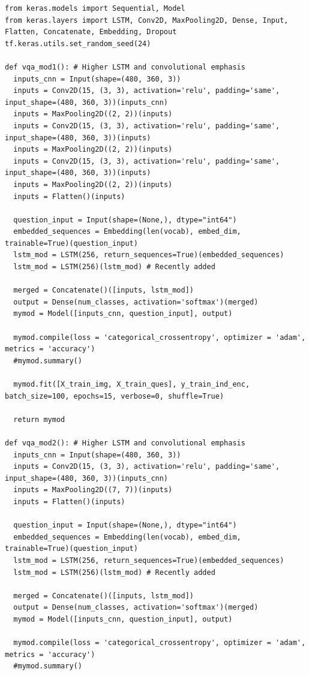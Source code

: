 \documentclass[12pt]{article}
\begin{document}
\begin{lstlisting}[breaklines=true]
from keras.models import Sequential, Model
from keras.layers import LSTM, Conv2D, MaxPooling2D, Dense, Input, Flatten, Concatenate, Embedding, Dropout
tf.keras.utils.set_random_seed(24)

def vqa_mod1(): # Higher LSTM and convolutional emphasis
  inputs_cnn = Input(shape=(480, 360, 3))
  inputs = Conv2D(15, (3, 3), activation='relu', padding='same', input_shape=(480, 360, 3))(inputs_cnn)
  inputs = MaxPooling2D((2, 2))(inputs)
  inputs = Conv2D(15, (3, 3), activation='relu', padding='same', input_shape=(480, 360, 3))(inputs)
  inputs = MaxPooling2D((2, 2))(inputs)
  inputs = Conv2D(15, (3, 3), activation='relu', padding='same', input_shape=(480, 360, 3))(inputs)
  inputs = MaxPooling2D((2, 2))(inputs)
  inputs = Flatten()(inputs)

  question_input = Input(shape=(None,), dtype="int64")
  embedded_sequences = Embedding(len(vocab), embed_dim, trainable=True)(question_input)
  lstm_mod = LSTM(256, return_sequences=True)(embedded_sequences)
  lstm_mod = LSTM(256)(lstm_mod) # Recently added

  merged = Concatenate()([inputs, lstm_mod])
  output = Dense(num_classes, activation='softmax')(merged)
  mymod = Model([inputs_cnn, question_input], output)

  mymod.compile(loss = 'categorical_crossentropy', optimizer = 'adam', metrics = 'accuracy')
  #mymod.summary()

  mymod.fit([X_train_img, X_train_ques], y_train_ind_enc, batch_size=100, epochs=15, verbose=0, shuffle=True)

  return mymod

def vqa_mod2(): # Higher LSTM and convolutional emphasis
  inputs_cnn = Input(shape=(480, 360, 3))
  inputs = Conv2D(15, (3, 3), activation='relu', padding='same', input_shape=(480, 360, 3))(inputs_cnn)
  inputs = MaxPooling2D((7, 7))(inputs)
  inputs = Flatten()(inputs)

  question_input = Input(shape=(None,), dtype="int64")
  embedded_sequences = Embedding(len(vocab), embed_dim, trainable=True)(question_input)
  lstm_mod = LSTM(256, return_sequences=True)(embedded_sequences)
  lstm_mod = LSTM(256)(lstm_mod) # Recently added

  merged = Concatenate()([inputs, lstm_mod])
  output = Dense(num_classes, activation='softmax')(merged)
  mymod = Model([inputs_cnn, question_input], output)

  mymod.compile(loss = 'categorical_crossentropy', optimizer = 'adam', metrics = 'accuracy')
  #mymod.summary()


\end{lstlisting}
\end{document}
